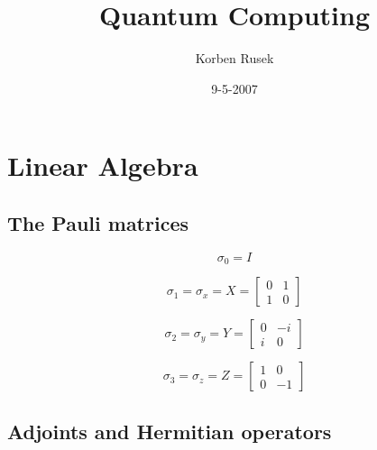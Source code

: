 \documentclass{article}
\author{Korben Rusek}
\title{Quantum Computing}
\date{9-5-2007}
\begin{document}
\maketitle
\newcommand{\gindex}[2]{|#1\!:\!#2|}
\newcommand{\lcm}{\textrm{lcm}}
\newcommand{\irr}{\textrm{irr}}
\newcommand{\sylp}{$Syl_{p}$}
\newcommand{\phnt}[1]{$\phantom{1}^{#1}$}
\newcommand{\gen}[1]{\langle#1\rangle}
\newcommand{\BN}{\mathbb{N}}
\newcommand{\BZ}{\mathbb{Z}}
\newcommand{\BQ}{\mathbb{Q}}
\newcommand{\BR}{\mathbb{R}}
\newcommand{\BC}{\mathbb{C}}
\newcommand{\BF}{\mathbb{F}}
\newcommand{\CF}{\mathcal{F}}
\newcommand{\CQ}{\mathcal{Q}}
\newcommand{\fa}{\mathfrak{a}}
\newcommand{\fb}{\mathfrak{b}}
\newcommand{\fp}{\mathfrak{p}}
\newcommand{\fq}{\mathfrak{q}}
\newcommand{\fm}{\mathfrak{m}}
\newcommand{\FN}{\mathfrak{N}}
\newcommand{\FR}{\mathfrak{R}}
\newcommand{\set}[1]{\{#1\}}
\newcommand{\trv}{\set{1}}
\newcommand{\Aut}{\mathrm{Aut}}
\newcommand{\End}{\mathrm{End}}
\newcommand{\Ker}{\mathrm{Ker}}
\newcommand{\chr}{\mathrm{char}}
\theoremstyle{definition}
\newtheorem{theorem}{Theorem}[section]
\newtheorem{definition}[theorem]{Definition}
\newtheorem{postulate}{Postulate}[section]

\section{Linear Algebra}

\setcounter{subsection}{2}
\subsection{The Pauli matrices}


\[
  \sigma_0=I
\]

\[
  \sigma_1=\sigma_x=X=
  \begin{bmatrix}
    0&1 \\
    1&0
  \end{bmatrix}
\]

\[
  \sigma_2=\sigma_y=Y=
  \begin{bmatrix}
    0&-i \\
    i&0
  \end{bmatrix}
\]

\[
  \sigma_3=\sigma_z=Z=
  \begin{bmatrix}
    1&0 \\
    0&-1
  \end{bmatrix}
\]

\setcounter{subsection}{5}
\subsection{Adjoints and Hermitian operators}
\end{document}
